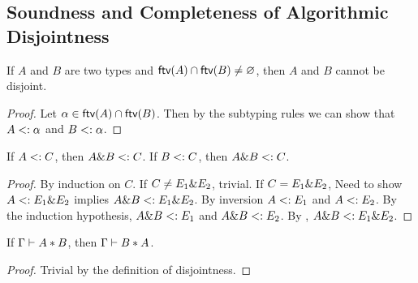\subsection{Soundness and Completeness of Algorithmic Disjointness}

%

\begin{lemma}
  If $A$ and $B$ are two types and $\textsf{ftv}(A) \cap \textsf{ftv}(B) \neq \varnothing$, then
  $A$ and $B$ cannot be disjoint.
\end{lemma}

\begin{proof}
  Let $\alpha \in \textsf{ftv}(A) \cap \textsf{ftv}(B)$. Then by the subtyping rules we can show
  that $A <: \alpha$ and $B <: \alpha$.
\end{proof}

\begin{theorem}
  If $A <: C$, then $A \& B <: C$.
  If $B <: C$, then $A \& B <: C$.
\end{theorem}


\begin{proof}
  By induction on $C$.
  If $C \neq E_1 \& E_2$, trivial.
  If $C = E_1 \& E_2$,
  Need to show $A <: E_1 \& E_2$ implies $A \& B <: E_1 \& E_2$.
  By inversion $A <: E_1$ and $A <: E_2$.
  By the induction hypothesis, $A \& B <: E_1$ and $A \& B <: E_2$.
  By , $A \& B <: E_1 \& E_2$.
\end{proof}

\begin{lemma}
  \label{lemma:symmetry-of-disjointness}

  If $\Gamma \vdash A * B$, then $\Gamma \vdash B * A$.
\end{lemma}

\begin{proof}
  Trivial by the definition of disjointness.
\end{proof}

